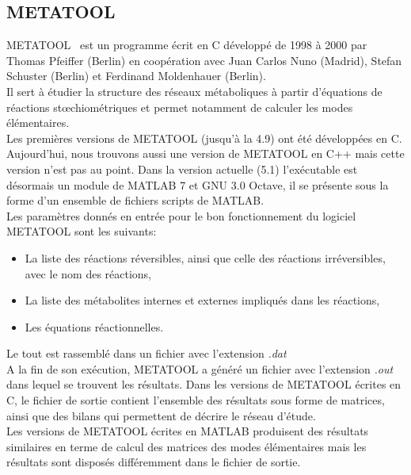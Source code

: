 \subsection{METATOOL} 
METATOOL~\cite{metatool} est un programme écrit en C développé de 1998 à 2000 par Thomas Pfeiffer (Berlin) en coopération avec Juan Carlos Nuno (Madrid), Stefan Schuster (Berlin) et Ferdinand Moldenhauer (Berlin).\\
Il sert à étudier la structure des réseaux métaboliques à partir d'équations de réactions stœchiométriques et permet notamment de calculer les modes élémentaires.\\
Les premières versions de METATOOL (jusqu'à la 4.9) ont été développées en C. Aujourd'hui, nous trouvons aussi une version de METATOOL en C++ mais cette version n'est pas au point. %
Dans la version actuelle (5.1) l'exécutable est désormais un module de MATLAB 7 et GNU 3.0 Octave, il se présente sous la forme d'un ensemble de fichiers scripts de MATLAB.\\

Les paramètres donnés en entrée pour le bon fonctionnement du logiciel METATOOL sont les suivants:
\begin{itemize}
\item La liste des réactions réversibles, ainsi que celle des réactions irréversibles, avec le nom des réactions,
\item La liste des métabolites internes et externes impliqués dans les réactions,
\item Les équations réactionnelles.
\end{itemize}
Le tout est rassemblé dans un fichier avec l'extension \textit{.dat}\\

A la fin de son exécution, METATOOL a généré un fichier avec l'extension \textit{.out} dans lequel se trouvent les résultats. Dans les versions de METATOOL écrites en C, le fichier de sortie contient l'ensemble des résultats sous forme de matrices, ainsi que des bilans qui permettent de décrire le réseau d'étude.\\
Les versions de METATOOL écrites en MATLAB produisent des résultats similaires en terme de calcul des matrices des modes élémentaires mais les résultats sont disposés différemment dans le fichier de sortie.

